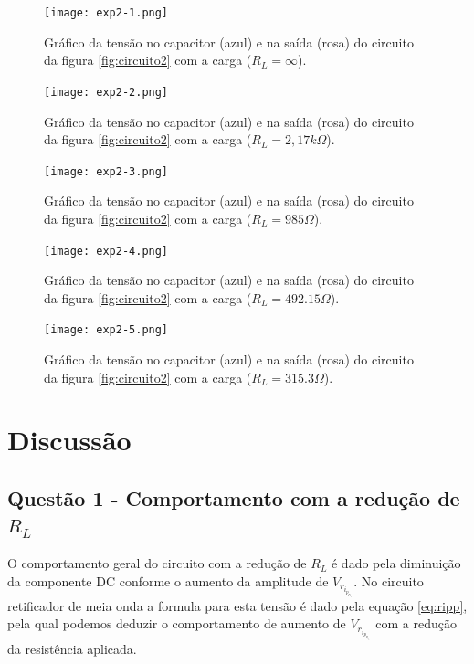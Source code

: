 \documentclass{abntex2}
\begin{document}
\begin{figure}[h]
  \centering
  \texttt{[image: exp2-1.png]}
  \caption{Gráfico da tensão no capacitor (azul) e na saída (rosa) do circuito da figura \ref{fig:circuito2} com a carga ($R_L = \infty$).}
  \label{fig:graf1}
\end{figure}

\begin{figure}[h]
  \centering
  \texttt{[image: exp2-2.png]}
  \caption{Gráfico da tensão no capacitor (azul) e na saída (rosa) do circuito da figura \ref{fig:circuito2} com a carga ($R_L = 2,17k\Omega$).}
  \label{fig:graf2}
\end{figure}

\begin{figure}[h]
  \centering
  \texttt{[image: exp2-3.png]}
  \caption{Gráfico da tensão no capacitor (azul) e na saída (rosa) do circuito da figura \ref{fig:circuito2} com a carga ($R_L = 985\Omega$).}
  \label{fig:graf3}
\end{figure}

\begin{figure}[h]
  \centering
  \texttt{[image: exp2-4.png]}
  \caption{Gráfico da tensão no capacitor (azul) e na saída (rosa) do circuito da figura \ref{fig:circuito2} com a carga ($R_L = 492.15\Omega$).}
  \label{fig:graf4}
\end{figure}

\begin{figure}[h]
  \centering
  \texttt{[image: exp2-5.png]}
  \caption{Gráfico da tensão no capacitor (azul) e na saída (rosa) do circuito da figura \ref{fig:circuito2} com a carga ($R_L = 315.3\Omega$).}
  \label{fig:graf5}
\end{figure}
\pagebreak
\chapter{Discussão}

\section{Questão 1 - Comportamento com a redução de $R_L$}

O comportamento geral do circuito com a redução de $R_L$ é dado pela diminuição da componente DC conforme o aumento da amplitude de $V_r_i_p_p_l_e$. No circuito retificador de meia onda a formula para esta tensão é
dado pela equação \ref{eq:ripp}, pela qual podemos deduzir o comportamento de aumento de $V_r_i_p_p_l_e$ com a redução da resistência aplicada.
\end{document}
